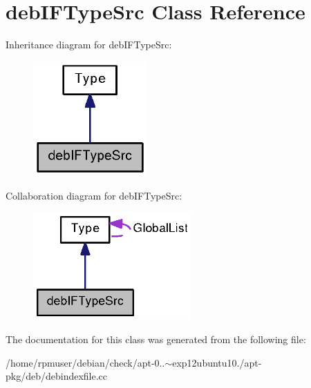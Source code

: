 \section{deb\-I\-F\-Type\-Src \-Class \-Reference}
\label{classdebIFTypeSrc}


\-Inheritance diagram for deb\-I\-F\-Type\-Src\-:
\nopagebreak
\begin{figure}[H]
\begin{center}
\leavevmode
\includegraphics[width=124pt]{classdebIFTypeSrc__inherit__graph}
\end{center}
\end{figure}


\-Collaboration diagram for deb\-I\-F\-Type\-Src\-:
\nopagebreak
\begin{figure}[H]
\begin{center}
\leavevmode
\includegraphics[width=171pt]{classdebIFTypeSrc__coll__graph}
\end{center}
\end{figure}


\-The documentation for this class was generated from the following file\-:\begin{DoxyCompactItemize}
\item 
/home/rpmuser/debian/check/apt-\/0..$\sim$exp12ubuntu10./apt-\/pkg/deb/debindexfile.\-cc\end{DoxyCompactItemize}
